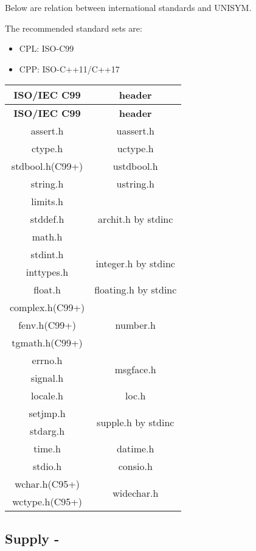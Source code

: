 
Below are relation between international standards and UNISYM.

The recommended standard sets are:
\begin{itemize}
\item CPL: ISO-C99
\item CPP: ISO-C++11/C++17
\end{itemize}

\begin{center}\begin{longtable}{|c|c|}
\hline
\textbf{ISO/IEC C99\cite{StdC99}} & \textbf{header} \\
\hline\endfirsthead\hline
\textbf{ISO/IEC C99\cite{StdC99}} & \textbf{header} \\
\hline\endhead\hline\endfoot\hline\endlastfoot
assert.h & uassert.h \\\hline
ctype.h & uctype.h \\\hline
stdbool.h(C99+) & ustdbool.h \\\hline
string.h & ustring.h \\\hline
limits.h & \multirow{3}{*}{archit.h by stdinc} \\\cline{1-1}
stddef.h & \\\cline{1-1}
math.h & \\\hline
stdint.h & \multirow{2}{*}{integer.h by stdinc} \\\cline{1-1}
inttypes.h & \\\hline
float.h & floating.h by stdinc \\\hline
complex.h(C99+) & \multirow{3}{*}{number.h} \\\cline{1-1}
fenv.h(C99+) & \\\cline{1-1}
tgmath.h(C99+) & \\\hline
errno.h & \multirow{2}{*}{msgface.h} \\\cline{1-1}
signal.h &  \\\hline
locale.h & loc.h \\\hline
setjmp.h & \multirow{2}{*}{supple.h by stdinc} \\\cline{1-1}
stdarg.h & \\\hline
time.h & datime.h \\\hline
stdio.h & consio.h \\\hline
wchar.h(C95+) & \multirow{2}{*}{widechar.h} \\\cline{1-1}
wctype.h(C95+) & \\\hline
\end{longtable}\end{center}

\subsection{Supply \mbox{-} }
